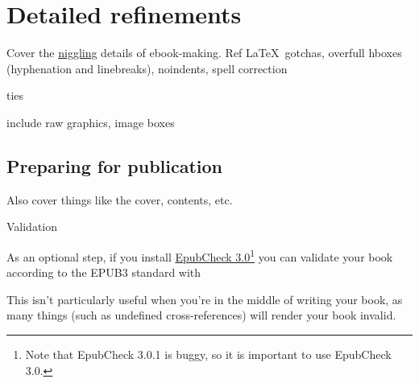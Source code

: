 \chapter{Detailed refinements} %
\label{cha:detailed_refinements}

Cover the \href{http://www.thefreedictionary.com/niggling}{niggling} details of ebook-making. Ref \LaTeX\ gotchas, overfull hboxes (hyphenation and linebreaks), noindents, spell correction

ties

include raw graphics, image boxes

\section{Preparing for publication} %
\label{sec:preparing_for_publication}

Also cover things like the cover,  contents, etc.

Validation

As an optional step, if you install \href{https://github.com/IDPF/epubcheck/releases/download/v3.0/epubcheck-3.0.zip}{EpubCheck 3.0}\footnote{Note that EpubCheck 3.0.1 is buggy, so it is important to use EpubCheck 3.0.} you can validate your book according to the EPUB3 standard with








\noindent This isn't particularly useful when you're in the middle of writing your book, as many things (such as undefined cross-references) will render your book invalid.



